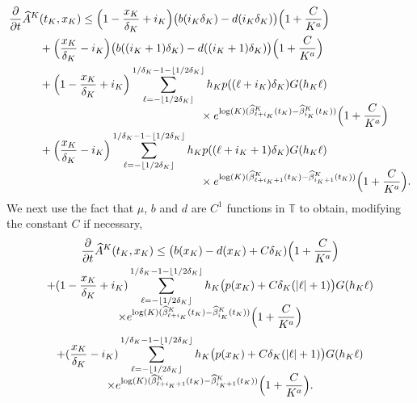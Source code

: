 \documentclass[10pt]{amsart}
\let\f\frac
\theoremstyle{plain}
\theoremstyle{remark}
\newcommand\T{\mathbb{T}}
\begin{document}
\begin{align*}
\frac{\partial}{\partial t} \widehat A^K&(t_K,x_K) \leq \Bigl(1-\f {x_K}{\delta_K}+i_K\Bigr) \big(b(i_K\delta_K) -d(i_K\delta_K)\big)\Bigl(1+\frac{C}{K^a}\Bigr)\\
&+\Bigl(\f {x_K}{\delta_K}-i_K\Bigr)\big(b((i_K+1)\delta_K) -d((i_K+1)\delta_K)\big)\Bigl(1+\frac{C}{K^a}\Bigr)\\
&+ \Bigl(1-\f {x_K}{\delta_K}+i_K\Bigr) \sum_{\ell=-\lfloor 1/2\delta_K\rfloor}^{1/\delta_K-1-\lfloor 1/2\delta_K\rfloor}h_Kp((\ell+i_K)\delta_K)G(h_K\ell) \\[-5pt]
& \hspace{5cm} \times e^{\log(K)(\widehat \beta_{\ell+i_K}^K(t_K)-\widehat\beta_{i_K}^K(t_K))}
\Bigl(1+\frac{C}{K^a}\Bigr)
\notag\\
&+ \Bigl(\f {x_K}{\delta_K}-i_K\Bigr) \sum_{\ell=-\lfloor 1/2\delta_K\rfloor}^{1/\delta_K-1-\lfloor 1/2\delta_K\rfloor}h_Kp((\ell+i_K+1)\delta_K)G(h_K\ell)\\[-5pt]
& \hspace{5cm} \times e^{\log(K)(\widehat \beta_{\ell+i_K+1}^K(t_K)-\widehat \beta_{i_K+1}^K(t_K))} \Bigl(1+\frac{C}{K^a}\Bigr).
\end{align*}
We next use the fact that $\mu$, $b$ and $d$ are $C^1$ functions in $\T$ to obtain, modifying the constant $C$ if necessary,\vspace*{-5pt}
\begin{multline}\label{eq:calcul-penible}
\frac{\partial}{\partial t} \widehat A^K(t_K,x_K) \leq \big(b(x_K)-d(x_K)+C\delta_K)\Bigl(1+\frac{C}{K^a}\Bigr)\\
+(1-\f {x_K}{\delta_K}+i_K) \sum_{\ell=-\lfloor 1/2\delta_K\rfloor}^{1/\delta_K-1-\lfloor 1/2\delta_K\rfloor}h_K \bigl(p(x_K)+C\delta_K(|\ell|+1)\bigr) G(h_K\ell)  \\[-5pt]
 \times e^{\log(K)(\widehat \beta_{\ell+i_K}^K(t_K)-\widehat \beta_{i_K}^K(t_K))} \Bigl(1+\frac{C}{K^a}\Bigr)
\end{multline}
\vspace*{-1.2\baselineskip}
\begin{multline*}
+ (\f {x_K}{\delta_K}-i_K) \sum_{\ell=-\lfloor 1/2\delta_K\rfloor}^{1/\delta_K-1-\lfloor 1/2\delta_K\rfloor}h_K \bigl(p(x_K)+C\delta_K(|\ell|+1)\bigr) G(h_K\ell) \\[-5pt]
\times e^{\log(K)(\widehat \beta_{\ell+i_K+1}^K(t_K)-\widehat\beta_{i_K+1}^K(t_K))} \Bigl(1+\frac{C}{K^a}\Bigr).
\end{multline*}
\end{document}
